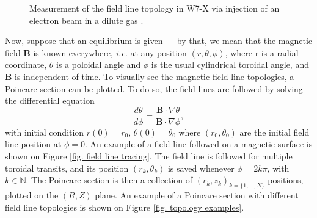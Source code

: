 \documentclass[my_thesis.tex]{subfiles}
\begin{document}
\begin{figure}%
	\centering
	\qquad
	\caption{Measurement of the field line topology in W7-X via injection of an electron beam in a dilute gas \citep{pedersenConfirmationTopologyWendelstein2016}.}
	\label{fig. w7x topology measurement}%
\end{figure}

Now, suppose that an equilibrium is given --- by that, we mean that the magnetic field $\mathbf{B}$ is known everywhere, \textit{i.e.} at any position $(r,\theta,\phi)$, where r is a radial coordinate, $\theta$ is a poloidal angle and $\phi$ is the usual cylindrical toroidal angle, and $\mathbf{B}$ is independent of time. To visually see the magnetic field line topologies, a Poincare section can be plotted. To do so, the field lines are followed by solving the differential equation
\begin{equation}
	\frac{d\theta}{d\phi} = \frac{\mathbf{B}\cdot\nabla\theta}{\mathbf{B}\cdot\nabla\phi},
\end{equation}
with initial condition $r(0)=r_0$, $\theta(0)=\theta_0$ where $(r_0,\theta_0)$ are the initial field line position at $\phi=0$. An example of a field line followed on a magnetic surface is shown on Figure \ref{fig. field line tracing}. The field line is followed for multiple toroidal transits, and its position $(r_k,\theta_k)$ is saved whenever $\phi=2k\pi$, with $k\in\mathbb{N}$. The Poincare section is then a collection of $(r_k,z_k)_{k=\{1,\ldots,N\}}$ positions, plotted on the $(R,Z)$ plane. An example of a Poincare section with different field line topologies is shown on Figure \ref{fig. topology examples}.
\end{document}

